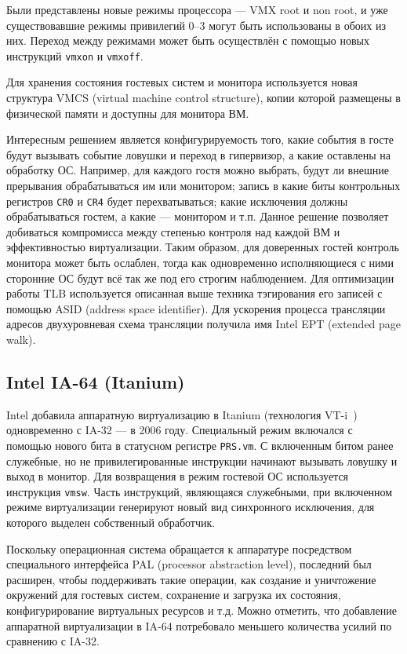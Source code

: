 Были представлены новые режимы процессора --- VMX root и non root, и уже существовавшие режимы привилегий 0--3 могут быть использованы в обоих из них. Переход между режимами может быть осуществлён с помощью новых инструкций \texttt{vmxon} и \texttt{vmxoff}. 

Для хранения состояния гостевых систем и монитора используется новая структура VMCS (\abbr virtual machine control structure), копии которой размещены в физической памяти и доступны для монитора ВМ.

Интересным решением является конфигурируемость того, какие события в госте будут вызывать событие ловушки и переход в гипервизор, а какие оставлены на обработку ОС. Например, для каждого гостя можно выбрать, будут ли внешние прерывания обрабатываться им или монитором; запись в какие биты контрольных регистров \texttt{CR0} и \texttt{CR4} будет перехватываться; какие исключения должны обрабатываться гостем, а какие --- монитором и т.п. Данное решение позволяет добиваться компромисса между степенью контроля над каждой ВМ и эффективностью виртуализации. Таким образом, для доверенных гостей контроль монитора может быть ослаблен, тогда как одновременно исполняющиеся с ними сторонние ОС будут всё так же под его строгим наблюдением. Для оптимизации работы TLB используется описанная выше техника тэгирования его записей с помощью ASID (\abbr address space identifier). Для ускорения процесса трансляции адресов двухуровневая схема трансляции получила имя Intel EPT (\abbr extended page walk).

\subsection{Intel IA-64 (Itanium)}

Intel добавила аппаратную виртуализацию в Itanium (технология VT-i~\cite{vtx}) одновременно с IA-32 --- в 2006 году. Специальный режим включался с помощью нового бита в статусном регистре \texttt{PRS.vm}. С включенным битом ранее служебные, но не привилегированные инструкции начинают вызывать ловушку и выход в монитор. Для возвращения в режим гостевой ОС используется инструкция \texttt{vmsw}. Часть инструкций, являющаяся служебными, при включенном режиме виртуализации генерируют новый вид синхронного исключения, для которого выделен собственный обработчик.

Поскольку операционная система обращается к аппаратуре посредством специального интерфейса PAL (\abbr processor abstraction level), последний был расширен, чтобы поддерживать такие операции, как создание и уничтожение окружений для гостевых систем, сохранение и загрузка их состояния, конфигурирование виртуальных ресурсов и т.д. Можно отметить, что добавление аппаратной виртуализации в IA-64 потребовало меньшего количества усилий по сравнению с IA-32.

